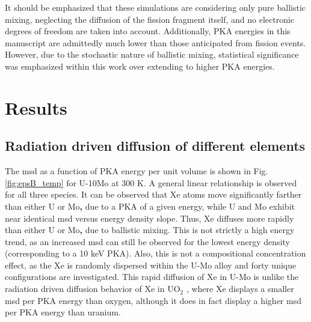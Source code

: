 \documentclass[review]{elsarticle}
\providecommand{\DIFaddtex}[1]{{\bf #1}} %
\providecommand{\DIFaddbegin}{\protect\color{blue}} %
\providecommand{\DIFaddend}{\protect\color{black}} %
\providecommand{\DIFadd}[1]{\texorpdfstring{\DIFaddtex{#1}}{#1}} %
\newcommand{\DIFaddincludegraphics}[2][]{{\color{blue}\fbox{\DIFOincludegraphics[#1]{#2}}}} %
\DeclareRobustCommand{\DIFaddbegin}{\DIFOaddbegin \let\includegraphics\DIFaddincludegraphics} %
\DeclareRobustCommand{\DIFaddend}{\DIFOaddend \let\includegraphics\DIFOincludegraphics} %
\begin{document}
It should be emphasized that these simulations are considering only pure ballistic mixing, neglecting the diffusion of the fission fragment itself, and no electronic degrees of freedom are taken into account. Additionally, PKA energies in this manuscript are admittedly much lower than those anticipated from fission events. However, due to the stochastic nature of ballistic mixing, statistical significance was emphasized within this work over extending to higher PKA energies. 

\FloatBarrier

\section{Results}

\subsection{Radiation driven diffusion of different elements}

The msd as a function of PKA energy per unit volume is shown in Fig. \ref{fig:epsB_temp} for U-10Mo at 300 K. A general linear relationship is observed for all three species. It can be observed that Xe atoms move significantly farther than either U or Mo\DIFaddbegin \DIFadd{, }\DIFaddend due to a PKA of a given energy, while U and Mo exhibit near identical msd versus energy density slope. Thus, Xe diffuses more rapidly than either U or Mo\DIFaddbegin \DIFadd{, }\DIFaddend due to ballistic mixing. This is not strictly a high energy trend, as an increased msd can still be observed for the lowest energy density (corresponding to a 10 keV PKA). Also, this is not a compositional concentration effect, as the Xe is randomly dispersed within the U-Mo alloy and forty unique configurations are investigated. This rapid diffusion of Xe in U-Mo is unlike the radiation driven diffusion behavior of Xe in UO$_2$ \cite{cooper2016}, where Xe displays a smaller msd per PKA energy than oxygen, although it does in fact display a higher msd per PKA energy than uranium. 
\end{document}
